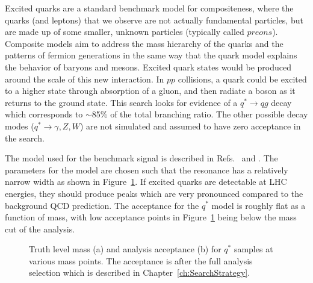 Excited quarks are a standard benchmark model for compositeness, where the quarks (and leptons) that we observe are not actually fundamental particles, but are made up of some smaller, unknown particles (typically called $preons$).  Composite models aim to address the mass hierarchy of the quarks and the patterns of fermion generations in the same way that the quark model explains the behavior of baryons and mesons.  Excited quark states would be produced around the scale of this new interaction.  In $pp$ collisions, a quark could be excited to a higher state through absorption of a gluon, and then radiate a boson as it returns to the ground state.  This search looks for evidence of a $q^* \rightarrow qg$ decay which corresponds to $\sim$85\% of the total branching ratio.  The other possible decay modes ($q^*\rightarrow\gamma,Z,W$) are not simulated and assumed to have zero acceptance in the search.

The model used for the benchmark signal is described in Refs.~\cite{QStar} and \cite{QStar2}.  The parameters for the model are chosen such that the resonance has a relatively narrow width as shown in Figure~\ref{fig:QStarPeaks}.  If excited quarks are detectable at LHC energies, they should produce peaks which are very pronounced compared to the background QCD prediction.  The acceptance for the $q^*$ model is roughly flat as a function of mass, with low acceptance points in Figure~\ref{fig:QStarPeaks} being below the mass cut of the analysis.

\begin{figure}[]
	\centering
	\hspace{0.05\columnwidth}%
	\caption{Truth level mass (a) and analysis acceptance (b) for $q^*$ samples at various mass points.  The acceptance is after the full analysis selection which is described in Chapter~\ref{ch:SearchStrategy}. 
	}
	\label{fig:QStarPeaks}
\end{figure}

